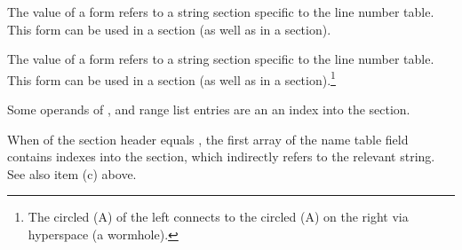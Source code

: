 \begin{description}
The value of a \DWFORMlinestrp{} form refers to a
string section specific to the line number table.
This form can be used in a \dotdebugline{} section
(as well as in a \dotdebuginfo{} section).

The value of a \DWFORMlinestrp{} form refers to a
string section specific to the line number table.
This form can be used in a \dotdebuginfo{} section
(as well as in a \dotdebugline{} section).\footnote{
\bb
The circled (A) of the left connects to the circled
(A) on the right
\eb
via hyperspace (a wormhole).}
\bb

Some operands of \DWRLEbaseaddressx, \DWRLEstartxendx{} and
\DWRLEstartxlength{} range list entries are an
an index into the \dotdebugaddr{} section.
\eb

%
\bb
{}
When \HFNstrformat{} of the section header equals \DWFORMstrxfour{},
the first array of the name table
field contains indexes into the \dotdebugstroffsets{} section,
which indirectly refers to the relevant string.
See also item (c) above.
\eb

\db
%


\end{description}




